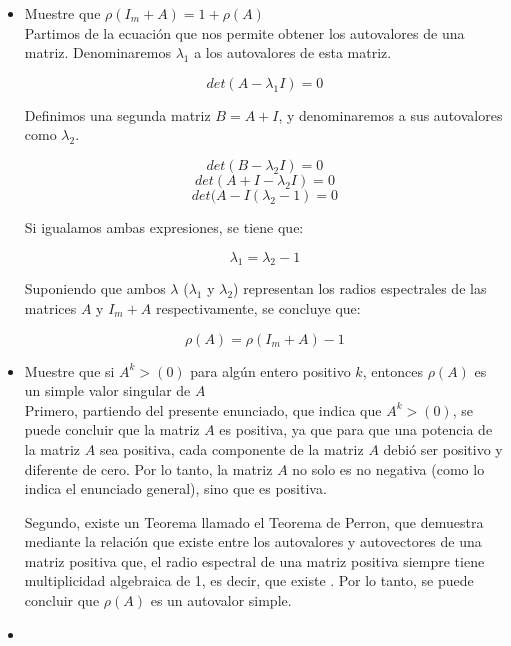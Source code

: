 \begin{itemize}

\item Muestre que $\rho(I_m + A) = 1 + \rho(A)$\\
    
    Partimos de la ecuación que nos permite obtener los autovalores de una matriz. Denominaremos $\lambda_1$ a los autovalores de esta matriz.
    
    \begin{equation*}
        det(A - \lambda_1 I) = 0
    \end{equation*}
    
    Definimos una segunda matriz $B = A + I$, y denominaremos a sus autovalores como $\lambda_2$. 
    
        $$det(B - \lambda_2 I) = 0$$
        $$det(A + I - \lambda_2 I) = 0 $$
        $$det(A - I ( \lambda_2 - 1) = 0 $$
    
    Si igualamos ambas expresiones, se tiene que:
 
    $$\lambda_1 = \lambda_2 - 1$$
    
    Suponiendo que ambos $\lambda$ ($\lambda_1$ y $\lambda_2$) representan los radios espectrales de las matrices $ A $ y $ I_m + A $ respectivamente, se concluye que:
    
    $$\rho(A) = \rho(I_m + A) - 1$$
    
\item Muestre que si $ A^k > (0) $ para algún entero positivo $k$, entonces $\rho(A)$ es un simple valor singular de $A$\\
    
    Primero, partiendo del presente enunciado, que indica que $ A^k > (0) $, se puede concluir que la matriz $A$ es positiva, ya que para que una potencia de la matriz $A$ sea positiva, cada componente de la matriz $A$ debió ser positivo y diferente de cero. Por lo tanto, la matriz $A$ no solo es no negativa (como lo indica el enunciado general), sino que es positiva.
    
    Segundo, existe un Teorema llamado el Teorema de Perron, que demuestra mediante la relación que existe entre los autovalores y autovectores de una matriz positiva que, el radio espectral de una matriz positiva siempre tiene multiplicidad algebraica de 1, es decir, que existe . Por lo tanto, se puede concluir que $\rho (A)$ es un autovalor simple.
    
\item 

\end{itemize}